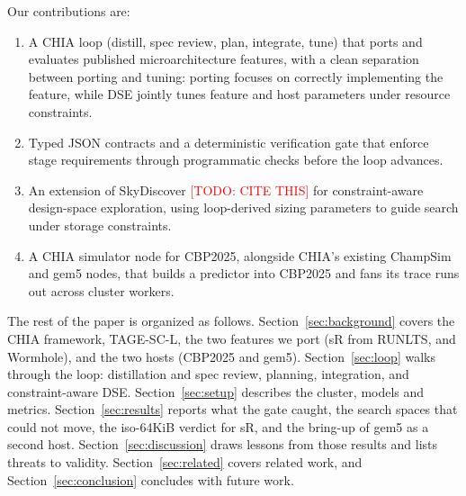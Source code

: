 \documentclass[conference]{IEEEtran}
\newcommand{\todo}[1]{\textcolor{red}{[TODO: #1]}}
\begin{document}
Our contributions are:
\begin{enumerate}
\item A CHIA loop (distill, spec review, plan, integrate, tune) that ports and evaluates published microarchitecture features,
with a clean separation between porting and tuning: porting focuses on correctly implementing the feature, while DSE jointly tunes feature and host parameters under resource constraints.
\item Typed JSON contracts and a deterministic verification gate that enforce
stage requirements through programmatic checks before the loop advances.
\item An extension of SkyDiscover \todo{CITE THIS} for constraint-aware design-space exploration,
using loop-derived sizing parameters to guide search under storage constraints.
\item A CHIA simulator node for CBP2025, alongside CHIA's existing ChampSim
and gem5 nodes, that builds a predictor into CBP2025 and fans its trace runs
out across cluster workers.
\end{enumerate}

The rest of the paper is organized as follows. Section~\ref{sec:background}
covers the CHIA framework, TAGE-SC-L, the two features we port (sR from RUNLTS,
and Wormhole), and the two hosts (CBP2025 and gem5).
Section~\ref{sec:loop} walks through the loop: distillation and
spec review, planning, integration, and constraint-aware DSE. Section~\ref{sec:setup}
describes the cluster, models and metrics. Section~\ref{sec:results} reports
what the gate caught, the search spaces that could not move, the iso-64KiB
verdict for sR, and the bring-up of gem5 as a second host.
Section~\ref{sec:discussion} draws lessons from those results and lists threats
to validity. Section~\ref{sec:related} covers related work, and
Section~\ref{sec:conclusion} concludes with future work.

\end{document}
